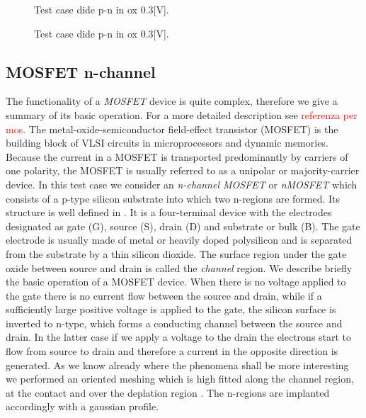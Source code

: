 \begin{figure}[!h]
\centering
{}
\hspace{1cm}
\caption{Test case dide p-n in ox 0.3[V].}
\label{fig: edensity diodeox}
\end{figure}

\begin{figure}[!h]
\centering
{}
\hspace{1cm}
\caption{Test case dide p-n in ox 0.3[V].}
\label{fig: hdensity diodeox}
\end{figure}

\clearpage









\subsection{MOSFET n-channel}

The functionality of a \textit{MOSFET} device is quite complex, therefore we give a summary of its basic operation. For a more detailed description see \textcolor{red}{referenza per mos}.
The metal-oxide-semiconductor field-effect transistor (MOSFET) is the building block of VLSI circuits in microprocessors and dynamic memories. Because the current in a MOSFET is transported predominantly by carriers of one polarity, the MOSFET is usually referred to as a unipolar or majority-carrier device.
In this test case we consider an \textit{n-channel MOSFET} or \textit{nMOSFET} which consists of a p-type silicon substrate into which two n-regions are formed. 
Its structure is well defined in . It is a four-terminal device with the electrodes designated as gate (G), source (S), drain (D) and substrate or bulk (B). The gate electrode is usually made of metal or heavily doped polysilicon and is separated from the substrate by a thin silicon dioxide. The surface region under the gate  oxide between source and drain is called the \textit{channel} region.
We describe briefly the basic operation of a MOSFET device.
When there is no voltage applied to the gate there is no current flow between the source and drain, while if a sufficiently large positive voltage is applied to the gate, the silicon surface is inverted to n-type, which forms a conducting channel between the source and drain. In the latter case if we apply a voltage to the drain the electrons start to flow from source to drain and therefore a current in the opposite direction is generated. 
As we know already where the phenomena shall be more interesting we performed an oriented meshing which is high fitted along the channel region, at the contact and over the deplation region . The n-regions are implanted accordingly with a gaussian profile.


